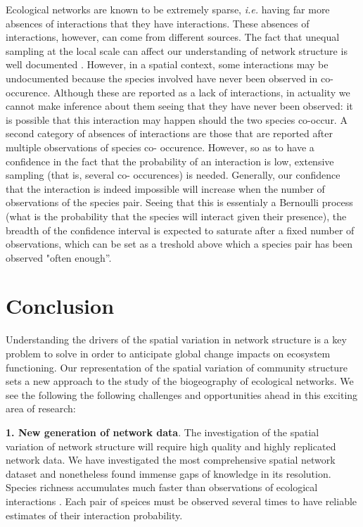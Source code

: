 \documentclass[12pt]{article}
\begin{document}
Ecological networks are known to be extremely sparse, \emph{i.e.} having far
more absences of interactions that they have interactions. These absences of
interactions, however, can come from different sources. The fact that unequal
sampling at the local scale can affect our understanding of network structure
is well documented \citep{Martinez1999}. However, in a spatial context,
some interactions may be undocumented because the species involved have never
been observed in co-occurence. Although these are reported as a lack of
interactions, in actuality we cannot make inference about them seeing that
they have never been observed: it is possible that this interaction may happen
should the two species co-occur. A second category of absences of interactions
are those that are reported after multiple observations of species co-
occurence. However, so as to have a confidence in the fact that the
probability of an interaction is low, extensive sampling (that is, several co-
occurences) is needed. Generally, our confidence that the interaction is
indeed impossible will increase when the number of observations of the species
pair. Seeing that this is essentialy a Bernoulli process (what is the
probability that the species will interact given their presence), the breadth
of the confidence interval is expected to saturate after a fixed number of
observations, which can be set as a treshold above which a species pair has
been observed "often enough”.

\section*{Conclusion}

Understanding the drivers of the spatial variation in network structure is a
key problem to solve in order to anticipate global change impacts on ecosystem
functioning. Our representation of the spatial variation of community
structure sets a new approach to the study of the biogeography of ecological
networks. We see the following the following challenges and opportunities
ahead in this exciting area of research:

\textbf{1. New generation of network data}. The investigation of the spatial variation
of network structure will require high quality and highly replicated network
data. We have investigated the most comprehensive spatial network dataset and
nonetheless found immense gaps of knowledge in its resolution. Species
richness accumulates much faster than observations of ecological interactions
\citep{Poisot2012}. Each pair of speices must be observed several times to have
reliable estimates of their interaction probability.
\end{document}
